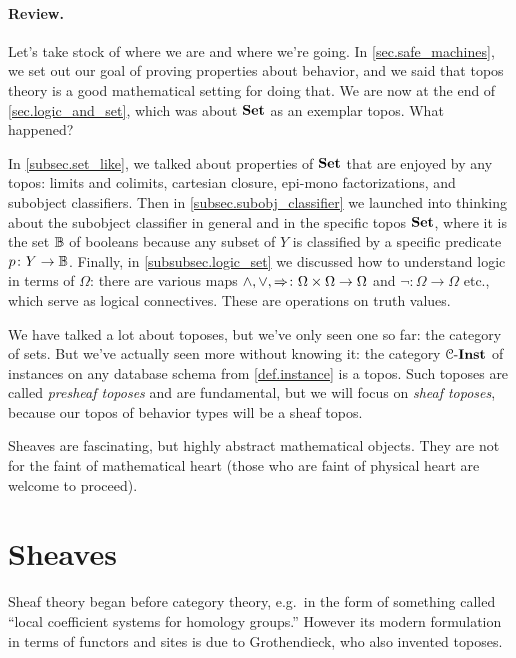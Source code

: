 \documentclass[7Sketches]{subfiles}
\begin{document}
\paragraph{Review.}
Let's take stock of where we are and where we're going. In \cref{sec.safe_machines}, we set out our goal of proving properties about behavior, and we said that topos theory is a good mathematical setting for doing that. We are now at the end of \cref{sec.logic_and_set}, which was about $\mathbf{Set}$ as an exemplar topos. What happened?

In \cref{subsec.set_like}, we talked about properties of $\mathbf{Set}$ that are enjoyed by any topos: limits and colimits, cartesian closure, epi-mono factorizations, and subobject classifiers. Then in \cref{subsec.subobj_classifier} we launched into thinking about the subobject classifier in general and in the specific topos $\mathbf{Set}$, where it is the set $\mathbb{B}$ of booleans because any subset of $Y$ is classified by a specific predicate $p\colon Y\to\mathbb{B}$. Finally, in \cref{subsubsec.logic_set} we discussed how to understand logic in terms of $\Omega$: there are various maps $\wedge,\vee,\Rightarrow\colon\Omega\times\Omega\to\Omega$ and $\neg\colon\Omega\to\Omega$ etc., which serve as logical connectives. These are operations on truth values.%
%

We have talked a lot about toposes, but we've only seen one so far: the category of sets. But we've actually seen more without knowing it: the category $\mathcal{C}\textnormal{-}\mathbf{Inst}$ of instances on any database schema from \cref{def.instance} is a topos. Such toposes are called \emph{presheaf toposes} and are fundamental, but we will focus on \emph{sheaf toposes}, because our topos of behavior types will be a sheaf topos.%

Sheaves are fascinating, but highly abstract mathematical objects. They are not for the faint of mathematical heart (those who are faint of physical heart are welcome to proceed). 

%

\section{Sheaves}%
\label{sec.sheaves}%


Sheaf theory began before category theory, e.g.\ in the form of something called
``local coefficient systems for homology groups.'' However its modern
formulation in terms of functors and sites is due to Grothendieck, who also
invented toposes.
\end{document}
